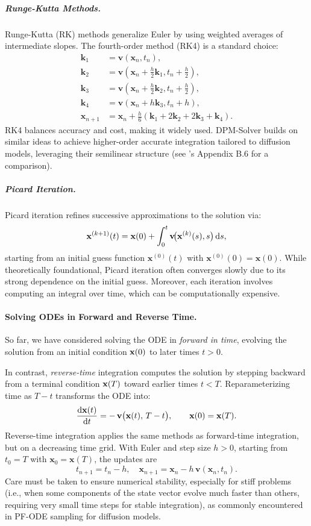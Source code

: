\subparagraph{Runge-Kutta Methods.}
Runge-Kutta (RK) methods generalize Euler by using weighted averages of intermediate slopes. The fourth-order method (RK4) is a standard choice:
\begin{align*}
\mathbf{k}_1 &= \mathbf{v}(\mathbf{x}_n, t_n), \\
\mathbf{k}_2 &= \mathbf{v}(\mathbf{x}_n + \tfrac{h}{2} \mathbf{k}_1, t_n + \tfrac{h}{2}), \\
\mathbf{k}_3 &= \mathbf{v}(\mathbf{x}_n + \tfrac{h}{2} \mathbf{k}_2, t_n + \tfrac{h}{2}), \\
\mathbf{k}_4 &= \mathbf{v}(\mathbf{x}_n + h \mathbf{k}_3, t_n + h), \\
\mathbf{x}_{n+1} &= \mathbf{x}_n + \tfrac{h}{6}(\mathbf{k}_1 + 2\mathbf{k}_2 + 2\mathbf{k}_3 + \mathbf{k}_4).
\end{align*}
RK4 balances accuracy and cost, making it widely used. DPM-Solver builds on similar ideas to achieve higher-order accurate integration tailored to diffusion models, leveraging their semilinear structure (see \citep{lu2022dpm}'s Appendix B.6 for a comparison).

\subparagraph{Picard Iteration.}
Picard iteration refines successive approximations to the solution via:
\[
\mathbf{x}^{(k+1)}(t)
= \mathbf{x}(0) + \int_0^t \mathbf{v}\!\big(\mathbf{x}^{(k)}(s), s\big) \mathop{}\!\mathrm{d} s,
\]
starting from an initial guess function
$\mathbf{x}^{(0)}(t)$ with $\mathbf{x}^{(0)}(0)=\mathbf{x}(0)$. While theoretically foundational, Picard iteration often converges slowly due to its strong dependence on the initial guess. Moreover, each iteration involves computing an integral over time, which can be computationally expensive.



\paragraph{Solving ODEs in Forward and Reverse Time.}
So far, we have considered solving the ODE in  \emph{forward in time}, evolving the solution from an initial condition ${\mathbf{x}}(0)$ to later times $t > 0$.

In contrast, \emph{reverse-time} integration computes the solution by stepping backward from a terminal condition ${\mathbf{x}}(T)$ toward earlier times $t < T$. Reparameterizing time as $T - t$ transforms the ODE into:
\[
\frac{\mathop{}\!\mathrm{d} \mathbf{x}(t)}{\mathop{}\!\mathrm{d} t}
= -\,\mathbf{v}\big(\mathbf{x}(t),\,T - t\big),
\qquad \mathbf{x}(0)=\mathbf{x}(T).
\]
Reverse-time integration applies the same methods as forward-time integration, 
but on a decreasing time grid. With Euler and step size $h>0$, starting from 
$t_0=T$ with $\mathbf{x}_0=\mathbf{x}(T)$, the updates are
\[
t_{n+1}=t_n-h, \quad 
\mathbf{x}_{n+1}=\mathbf{x}_n - h\,\mathbf{v}(\mathbf{x}_n,t_n).
\]
Care must be taken to ensure numerical stability, especially for stiff problems (i.e., when some components of the state vector evolve much faster than others, requiring very small time steps for stable integration), as commonly encountered in PF-ODE sampling for diffusion models.

